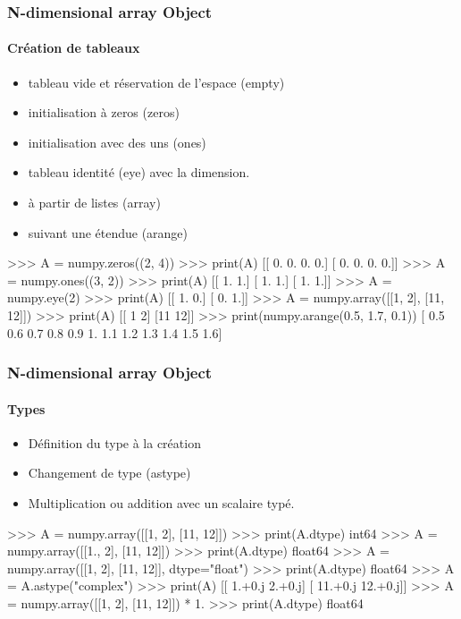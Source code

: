 \begin{frame}[fragile]
\frametitle{N-dimensional array Object}
\framesubtitle{Création de tableaux}
\begin{itemize}
 \item tableau vide et réservation de l'espace (empty)
 \item initialisation à zeros (zeros)
 \item initialisation avec des uns (ones)
 \item tableau identité (eye) avec la dimension. 
 \item à partir de listes (array)
 \item suivant une étendue (arange)
\end{itemize}
\begin{pythonConsole}
>>> A = numpy.zeros((2, 4))
>>> print(A)
[[ 0.  0.  0.  0.]
 [ 0.  0.  0.  0.]]
>>> A = numpy.ones((3, 2))
>>> print(A)
[[ 1.  1.]
 [ 1.  1.]
 [ 1.  1.]]
>>> A = numpy.eye(2)
>>> print(A)
[[ 1.  0.]
 [ 0.  1.]]
>>> A = numpy.array([[1, 2], [11, 12]])
>>> print(A)
[[ 1  2]
 [11 12]]
>>> print(numpy.arange(0.5, 1.7, 0.1))
[ 0.5  0.6  0.7  0.8  0.9  1.   1.1  1.2  1.3  1.4  1.5  1.6]
\end{pythonConsole}
\end{frame}
\begin{frame}[fragile]
\frametitle{N-dimensional array Object}
\framesubtitle{Types}
\begin{itemize}
 \item Définition du type à la création
 \item Changement de type (astype)
 \item Multiplication ou addition avec un scalaire typé. 
\end{itemize}
\begin{pythonConsole}
>>> A = numpy.array([[1, 2], [11, 12]])
>>> print(A.dtype)
int64
>>> A = numpy.array([[1., 2], [11, 12]])
>>> print(A.dtype)
float64
>>> A = numpy.array([[1, 2], [11, 12]], dtype="float")
>>> print(A.dtype)
float64
>>> A = A.astype("complex")
>>> print(A)
[[  1.+0.j   2.+0.j]
 [ 11.+0.j  12.+0.j]]
>>> A = numpy.array([[1, 2], [11, 12]]) * 1.
>>> print(A.dtype)
float64
\end{pythonConsole}
\end{frame}
